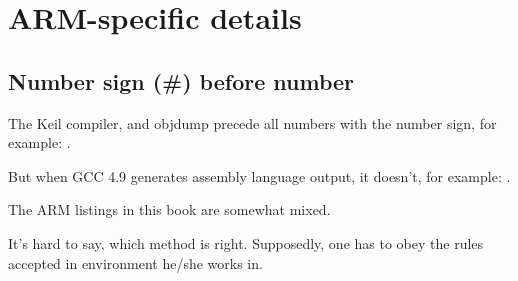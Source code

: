 ﻿\section{ARM-specific details}

\subsection{Number sign (\#) before number}

The Keil compiler, \IDA and objdump precede all numbers with the \q{\#} number sign, for example:
.

But when GCC 4.9 generates assembly language output, it doesn't, for example: 
.

The ARM listings in this book are somewhat mixed.

It's hard to say, which method is right.
Supposedly, one has to obey the rules accepted in environment he/she works in.




